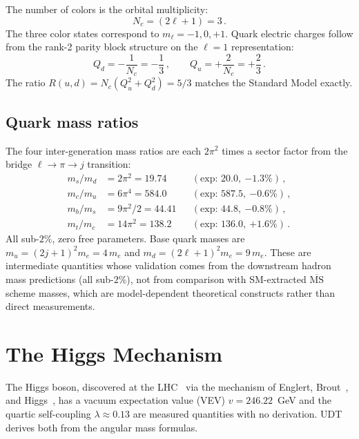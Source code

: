 \documentclass[aps,prd,twocolumn,superscriptaddress,nofootinbib,longbibliography]{revtex4-2}
\begin{document}
The number of colors is the orbital multiplicity:
\begin{equation}
  N_c = (2\ell + 1) = 3\,.
\end{equation}
The three color states correspond to $m_\ell = -1, 0, +1$.  Quark
electric charges follow from the rank-2 parity block structure on the
$\ell = 1$ representation:
\begin{equation}
  Q_d = -\frac{1}{N_c} = -\frac{1}{3}\,,
  \qquad
  Q_u = +\frac{2}{N_c} = +\frac{2}{3}\,.
\end{equation}
The ratio $R(u,d) = N_c(Q_u^2 + Q_d^2) = 5/3$ matches the Standard
Model exactly.

\subsection{Quark mass ratios}

The four inter-generation mass ratios are each $2\pi^2$ times a
sector factor from the bridge $\ell \to \pi \to j$ transition:
\begin{align}
  m_s/m_d &= 2\pi^2 = 19.74
    &&(\text{exp: }20.0,\ {-1.3\%})\,,\\
  m_c/m_u &= 6\pi^4 = 584.0
    &&(\text{exp: }587.5,\ {-0.6\%})\,,\\
  m_b/m_s &= 9\pi^2/2 = 44.41
    &&(\text{exp: }44.8,\ {-0.8\%})\,,\\
  m_t/m_c &= 14\pi^2 = 138.2
    &&(\text{exp: }136.0,\ {+1.6\%})\,.
\end{align}
All sub-$2\%$, zero free parameters.  Base quark masses are
$m_u = (2j+1)^2 m_e = 4\,m_e$ and
$m_d = (2\ell+1)^2 m_e = 9\,m_e$.  These are intermediate quantities
whose validation comes from the downstream hadron mass predictions
(all sub-$2\%$), not from comparison with SM-extracted
$\overline{\mathrm{MS}}$ scheme masses, which are model-dependent
theoretical constructs rather than direct measurements.

\section{The Higgs Mechanism}\label{sec:higgs}

The Higgs boson, discovered at the LHC~\cite{ATLAS2012,CMS2012} via the mechanism of Englert, Brout~\cite{Englert1964}, and Higgs~\cite{Higgs1964}, has a vacuum expectation value (VEV)
$v = 246.22$~GeV and the quartic self-coupling $\lambda \approx 0.13$
are measured quantities with no derivation.  UDT derives both from
the angular mass formulas.
\end{document}
